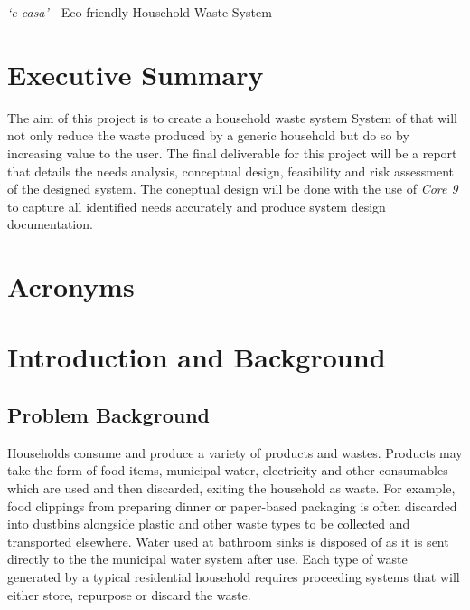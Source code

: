\documentclass[a4paper,11pt,fleqn]{report}
\begin{document}

\textit{`e-casa'} - Eco-friendly Household Waste System

\chapter*{Executive Summary}
The aim of this project is to create a household waste system System of that will not only reduce the waste produced by a generic household but do so by increasing value to the user. The final deliverable for this project will be a report that details the needs analysis, conceptual design, feasibility and risk assessment of the designed system. The coneptual design will be done with the use of \textit{Core 9} to capture all identified needs accurately and produce system design documentation.

\tableofcontents
\listoffigures{}
\listoftables{}

\chapter*{Acronyms}
\begin{acronym}[ABCDEF]
\end{acronym}

\chapter{Introduction and Background}
\setcounter{page}{1}
\acresetall

\section{Problem Background} \label{sec: Problem Background}
 Households consume and produce a variety of products and wastes. Products may take the form of food items, municipal water, electricity and other consumables which are used and then discarded, exiting the household as waste. For example, food clippings from preparing dinner or paper-based packaging is often discarded into dustbins alongside plastic and other waste types to be collected and transported elsewhere. Water used at bathroom sinks is disposed of as it is sent directly to the the municipal water system after use. Each type of waste generated by a typical residential household requires proceeding systems that will either store, repurpose or discard the waste.
  
\end{document}
